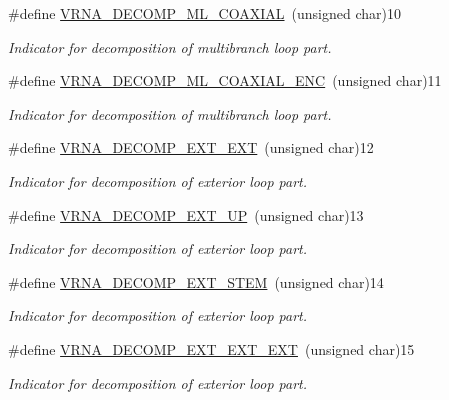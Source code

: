 \begin{DoxyCompactItemize}
\#define \mbox{\hyperlink{group__constraints_ga4fe48d575830b16c208e280e01ab1497}{V\+R\+N\+A\+\_\+\+D\+E\+C\+O\+M\+P\+\_\+\+M\+L\+\_\+\+C\+O\+A\+X\+I\+AL}}~(unsigned char)10
\begin{DoxyCompactList}\small\item\em Indicator for decomposition of multibranch loop part. \end{DoxyCompactList}\item 
\#define \mbox{\hyperlink{group__constraints_ga0224727f7b8ad2f23eb0a3fd28d8b3fb}{V\+R\+N\+A\+\_\+\+D\+E\+C\+O\+M\+P\+\_\+\+M\+L\+\_\+\+C\+O\+A\+X\+I\+A\+L\+\_\+\+E\+NC}}~(unsigned char)11
\begin{DoxyCompactList}\small\item\em Indicator for decomposition of multibranch loop part. \end{DoxyCompactList}\item 
\#define \mbox{\hyperlink{group__constraints_ga437adf5115c1999304eff26b41e4c9b6}{V\+R\+N\+A\+\_\+\+D\+E\+C\+O\+M\+P\+\_\+\+E\+X\+T\+\_\+\+E\+XT}}~(unsigned char)12
\begin{DoxyCompactList}\small\item\em Indicator for decomposition of exterior loop part. \end{DoxyCompactList}\item 
\#define \mbox{\hyperlink{group__constraints_gaff1ddaffe86d984623910b40cc8a8717}{V\+R\+N\+A\+\_\+\+D\+E\+C\+O\+M\+P\+\_\+\+E\+X\+T\+\_\+\+UP}}~(unsigned char)13
\begin{DoxyCompactList}\small\item\em Indicator for decomposition of exterior loop part. \end{DoxyCompactList}\item 
\#define \mbox{\hyperlink{group__constraints_gae44b5ace0d9b4a29088069ecb4cec441}{V\+R\+N\+A\+\_\+\+D\+E\+C\+O\+M\+P\+\_\+\+E\+X\+T\+\_\+\+S\+T\+EM}}~(unsigned char)14
\begin{DoxyCompactList}\small\item\em Indicator for decomposition of exterior loop part. \end{DoxyCompactList}\item 
\#define \mbox{\hyperlink{group__constraints_ga803bd818b3f4b2b0a4a5cfa2f7dc2045}{V\+R\+N\+A\+\_\+\+D\+E\+C\+O\+M\+P\+\_\+\+E\+X\+T\+\_\+\+E\+X\+T\+\_\+\+E\+XT}}~(unsigned char)15
\begin{DoxyCompactList}\small\item\em Indicator for decomposition of exterior loop part. \end{DoxyCompactList}\item 

\end{DoxyCompactItemize}
